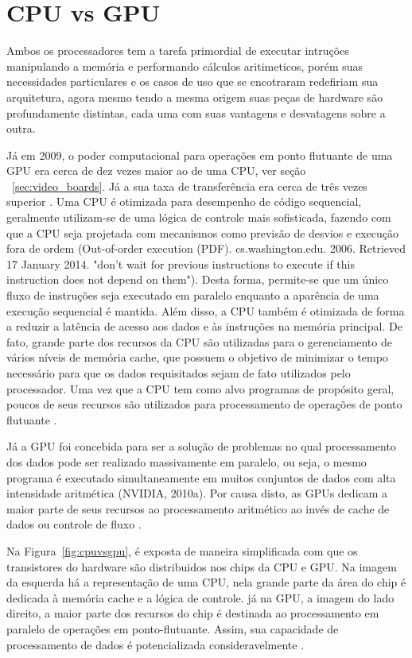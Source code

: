 \section{CPU vs GPU}

  Ambos os processadores tem a tarefa primordial de executar intruções manipulando a memória e performando cálculos aritimeticos, porém suas necessidades particulares e os casos de uso que se encotraram redefiriam sua arquitetura, agora mesmo tendo a mesma origem suas peças de hardware são profundamente distintas, cada uma com suas vantagens e desvatagens sobre a outra.

  Já em 2009, o poder computacional para operações em ponto flutuante de uma GPU era cerca de dez vezes maior ao de uma CPU, ver seção ~\ref{sec:video_boards}. Já a sua taxa de transferência era cerca de três vezes superior \citep{massively:16}. Uma CPU é otimizada para desempenho de código sequencial, geralmente utilizam-se de uma lógica de controle mais sofisticada, fazendo com que a CPU seja projetada com mecanismos como previsão de desvios e execução fora de ordem (Out-of-order execution (PDF). cs.washington.edu. 2006. Retrieved 17 January 2014. "don't wait for previous instructions to execute if this instruction does not depend on them"). Desta forma, permite-se que um único fluxo de instruções seja executado em paralelo enquanto a aparência de uma execução sequencial é mantida. Além disso, a CPU também é otimizada de forma a reduzir a latência de acesso aos dados e às instruções na memória principal. De fato, grande parte dos recursos da CPU são utilizadas para o gerenciamento de vários níveis de memória cache, que possuem o objetivo de minimizar o tempo necessário para que os dados requisitados sejam de fato utilizados pelo processador. Uma vez que a CPU tem como alvo programas de propósito geral, poucos de seus recursos são utilizados para processamento de operações de ponto flutuante \citep{massively:16}.

  Já a GPU foi concebida para ser a solução de problemas no qual processamento dos dados pode ser realizado massivamente em paralelo, ou seja, o mesmo programa é executado simultaneamente em muitos conjuntos de dados com alta intensidade aritmética (NVIDIA, 2010a). Por causa disto, as GPUs dedicam a maior parte de seus recursos ao processamento aritmético ao invés de cache de dados ou controle de fluxo \citep{massively:16}.

  Na Figura~\ref{fig:cpuvsgpu}, é exposta de maneira simplificada com que os transistores do hardware são distribuidos nos chips da CPU e GPU. Na imagem da esquerda há a representação de uma CPU, nela grande parte da área do chip é dedicada à memória cache e a lógica de controle. já na GPU, a imagem do lado direito, a maior parte dos recursos do chip é destinada ao processamento em paralelo de operações em ponto-flutuante. Assim, sua capacidade de processamento de dados é potencializada consideravelmente \citep{NTesla:16}.

